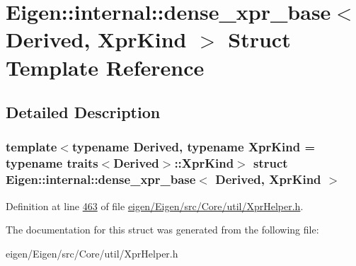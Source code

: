\hypertarget{struct_eigen_1_1internal_1_1dense__xpr__base}{}\section{Eigen\+:\+:internal\+:\+:dense\+\_\+xpr\+\_\+base$<$ Derived, Xpr\+Kind $>$ Struct Template Reference}
\label{struct_eigen_1_1internal_1_1dense__xpr__base}


\subsection{Detailed Description}
\subsubsection*{template$<$typename Derived, typename Xpr\+Kind = typename traits$<$\+Derived$>$\+::\+Xpr\+Kind$>$\newline
struct Eigen\+::internal\+::dense\+\_\+xpr\+\_\+base$<$ Derived, Xpr\+Kind $>$}



Definition at line \hyperlink{eigen_2_eigen_2src_2_core_2util_2_xpr_helper_8h_source_l00463}{463} of file \hyperlink{eigen_2_eigen_2src_2_core_2util_2_xpr_helper_8h_source}{eigen/\+Eigen/src/\+Core/util/\+Xpr\+Helper.\+h}.



The documentation for this struct was generated from the following file\+:\begin{DoxyCompactItemize}
\item 
eigen/\+Eigen/src/\+Core/util/\+Xpr\+Helper.\+h\end{DoxyCompactItemize}
